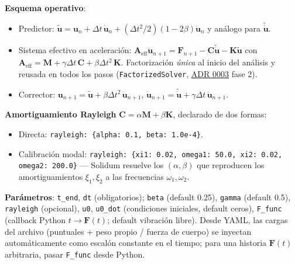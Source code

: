 \documentclass[11pt,oneside]{report}
\begin{document}
\textbf{Esquema operativo}:

\begin{itemize}
  \item Predictor: $\tilde{\mathbf u} = \mathbf u_n + \Delta t\,\dot{\mathbf u}_n + (\Delta t^2/2)(1 - 2\beta)\ddot{\mathbf u}_n$ y análogo para $\tilde{\dot{\mathbf u}}$.
  \item Sistema efectivo en aceleración: $\mathbf A_{\text{eff}}\ddot{\mathbf u}_{n+1} = \mathbf F_{n+1} - \mathbf C\tilde{\dot{\mathbf u}} - \mathbf K\tilde{\mathbf u}$ con $\mathbf A_{\text{eff}} = \mathbf M + \gamma\Delta t\,\mathbf C + \beta\Delta t^2\,\mathbf K$. Factorización \textit{única} al inicio del análisis y reusada en todos los pasos (\texttt{FactorizedSolver}, \href{https://github.com/jretamav/solidum-fem/blob/main/docs/adr/0003-despachador-de-solver-algebraico.md}{ADR 0003} fase 2).
  \item Corrector: $\mathbf u_{n+1} = \tilde{\mathbf u} + \beta\Delta t^2\,\ddot{\mathbf u}_{n+1}$, $\dot{\mathbf u}_{n+1} = \tilde{\dot{\mathbf u}} + \gamma\Delta t\,\ddot{\mathbf u}_{n+1}$.
\end{itemize}

\textbf{Amortiguamiento Rayleigh} $\mathbf C = \alpha\mathbf M + \beta\mathbf K$, declarado de dos formas:

\begin{itemize}
  \item Directa: \texttt{rayleigh: \{alpha: 0.\allowbreak{}1, beta: 1.\allowbreak{}0e-4\}}.
  \item Calibración modal: \texttt{rayleigh: \{xi1: 0.\allowbreak{}02, omega1: 50.\allowbreak{}0, xi2: 0.\allowbreak{}02, omega2: 200.\allowbreak{}0\}} --- Solidum resuelve los $(\alpha, \beta)$ que reproducen los amortiguamientos $\xi_1, \xi_2$ a las frecuencias $\omega_1, \omega_2$.
\end{itemize}

\textbf{Parámetros}: \texttt{t\_end}, \texttt{dt} (obligatorios); \texttt{beta} (default 0.25), \texttt{gamma} (default 0.5), \texttt{rayleigh} (opcional), \texttt{u0}, \texttt{u0\_dot} (condiciones iniciales, default ceros), \texttt{F\_func} (callback Python $t \to \mathbf F(t)$; default vibración libre). Desde YAML, las cargas del archivo (puntuales + peso propio / fuerza de cuerpo) se inyectan automáticamente como escalón constante en el tiempo; para una historia $\mathbf F(t)$ arbitraria, pasar \texttt{F\_func} desde Python.
\end{document}
